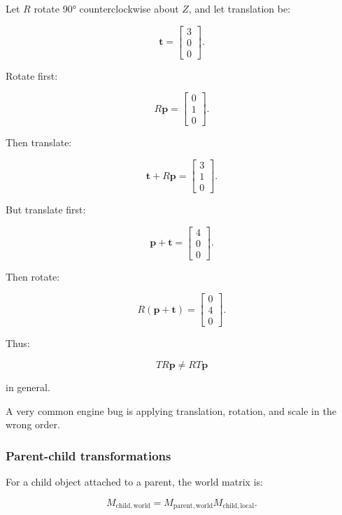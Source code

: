 Let \(R\) rotate 90° counterclockwise about \(Z\), and let translation be:

\[
 \mathbf t= \begin{bmatrix}3\\0\\0\end{bmatrix}.
\]

Rotate first:

\[
 R\mathbf p= \begin{bmatrix}0\\1\\0\end{bmatrix}.
\]

Then translate:

\[
 \mathbf t+R\mathbf p= \begin{bmatrix}3\\1\\0\end{bmatrix}.
\]

But translate first:

\[
 \mathbf p+\mathbf t= \begin{bmatrix}4\\0\\0\end{bmatrix}.
\]

Then rotate:

\[
 R(\mathbf p+\mathbf t)= \begin{bmatrix}0\\4\\0\end{bmatrix}.
\]

Thus:

\[
 \boxed{TR\mathbf p\ne RT\mathbf p}
\]

in general.

A very common engine bug is applying translation, rotation, and scale in the wrong order.

\subsubsection{Parent-child transformations}\label{02-foundations-ii-ch032-parent-child-transformations}

\hypertarget{02-foundations-ii-ch032-parent-child-transformations}{}

For a child object attached to a parent, the world matrix is:

\[
 \boxed{ M_{\mathrm{child,world}} = M_{\mathrm{parent,world}} M_{\mathrm{child,local}} }.
\]

